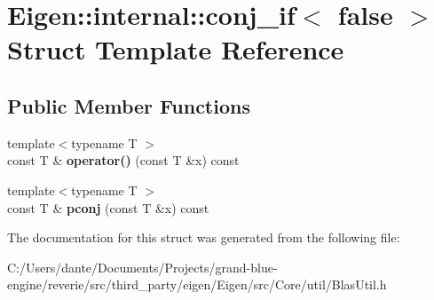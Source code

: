 \hypertarget{struct_eigen_1_1internal_1_1conj__if_3_01false_01_4}{}\section{Eigen\+::internal\+::conj\+\_\+if$<$ false $>$ Struct Template Reference}
\label{struct_eigen_1_1internal_1_1conj__if_3_01false_01_4}
\subsection*{Public Member Functions}
\begin{DoxyCompactItemize}
\item 
\mbox{\label{struct_eigen_1_1internal_1_1conj__if_3_01false_01_4_a639324040d96a2e3f5e40c96dd2b5065}} 
{\footnotesize template$<$typename T $>$ }\\const T \& {\bfseries operator()} (const T \&x) const
\item 
\mbox{\label{struct_eigen_1_1internal_1_1conj__if_3_01false_01_4_a25e035754a0b3cad3af8cca1ae57abb9}} 
{\footnotesize template$<$typename T $>$ }\\const T \& {\bfseries pconj} (const T \&x) const
\end{DoxyCompactItemize}


The documentation for this struct was generated from the following file\+:\begin{DoxyCompactItemize}
\item 
C\+:/\+Users/dante/\+Documents/\+Projects/grand-\/blue-\/engine/reverie/src/third\+\_\+party/eigen/\+Eigen/src/\+Core/util/Blas\+Util.\+h\end{DoxyCompactItemize}
